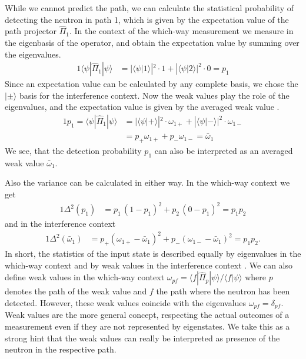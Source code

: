 \documentclass[english,keywords,aps,twocolumn]{revtex4-1}
\begin{document}
While we cannot predict the path, we can calculate the statistical probability of detecting the neutron in path 1, which is given by the expectation value of the path projector $\hat\Pi_1$. In the context of the which-way measurement we measure in the eigenbasis of the operator, and obtain the expectation value by summing over the eigenvalues.
\begin{alignat}{1}
  \langle\psi |\hat\Pi_{1}|\psi\rangle &= |\langle\psi|1\rangle|^2 \cdot 1 +  |\langle\psi|2\rangle|^2 \cdot 0 = p_1
\end{alignat}
Since an expectation value can be calculated by any complete basis, we chose the $|\pm\rangle$ basis for the interference context. Now the weak values play the role of the eigenvalues, and the expectation value is given by the averaged weak value \cite{Hosoya10,Hall16}.
\begin{alignat}{1}
 p_1= \langle\psi |\hat\Pi_{1}|\psi\rangle &= |\langle\psi|+\rangle|^2 \cdot \omega_{1+} +  |\langle\psi|-\rangle|^2 \cdot \omega_{1-} \nonumber\\
  &= p_+ \omega_{1+}  + p_- \omega_{1-} 
  = \bar \omega_{1}  \label{eq:p1}
\end{alignat}
We see, that the detection probability $p_1$ can also be interpreted as an averaged weak value $\bar\omega_1$.

Also the variance can be calculated in either way. In the which-way context we get
\begin{alignat}{1}
  \mathit\Delta^2(p_{1}) &= p_1 \, (1 - p_{1})^2   + p_2 \,  (0 - p_{1})^2 = p_1 p_2 \label{eq:Deltap1}
\end{alignat}
and in the interference context
\begin{alignat}{1}
  \mathit\Delta^2(\bar \omega_{1}) &= p_+ (\omega_{1+} - \bar \omega_{1})^2   + p_-  (\omega_{1-}- \bar \omega_{1})^2
 = p_1 p_2. \label{eq:Deltaomega}
\end{alignat}
In short, the statistics of the input state is described equally by eigenvalues in the which-way context and by weak values in the interference context \cite{hofmann2020}. We can also define weak values in the which-way context $\omega_{pf}=\langle f |\hat\Pi_p|\psi\rangle/ \langle f | \psi \rangle$ where $p$ denotes the path of the weak value and $f$ the path where the neutron has been detected. However, these weak values coincide with the eigenvalues $\omega_{pf}=\delta_{pf}$. Weak values are the more general concept, respecting the actual outcomes of a measurement even if they are not represented by eigenstates. We take this as a strong hint that the weak values can really be interpreted as presence of the neutron in the respective path.
\end{document}
